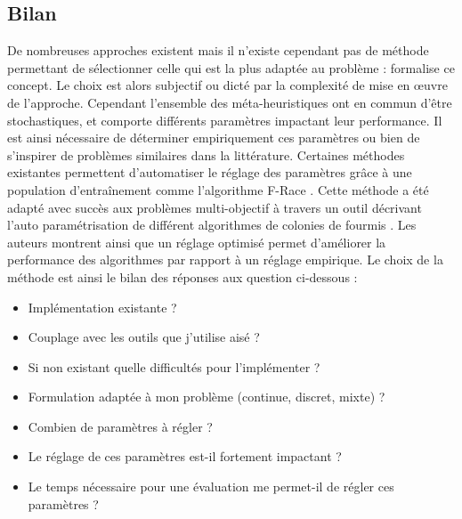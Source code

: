 \subsection{Bilan} %
\label{sub:bilan}
De nombreuses approches existent mais il n’existe cependant pas de méthode permettant de
sélectionner celle qui est la plus adaptée au problème : \cite{Wolpert199767} formalise
ce concept. Le choix est alors subjectif ou dicté par la complexité de mise en œuvre
de l’approche.
Cependant l’ensemble des méta-heuristiques ont en commun d’être stochastiques, et comporte
différents paramètres impactant leur performance.
Il est ainsi nécessaire de déterminer empiriquement ces paramètres ou bien de s’inspirer
de problèmes similaires dans la littérature.
Certaines méthodes existantes permettent d’automatiser le réglage des
paramètres grâce à une population d’entraînement comme l’algorithme F-Race \parencite{Birattari2010311}.
Cette méthode a été adapté avec succès aux problèmes multi-objectif à travers un outil
décrivant l’auto paramétrisation de différent algorithmes de colonies de fourmis \parencite{Lopez-Ibanez2012861}.
Les auteurs montrent ainsi que un réglage optimisé permet d’améliorer la performance
des algorithmes par rapport à un réglage empirique.
Le choix de la méthode est ainsi le bilan des réponses aux question ci-dessous :
\begin{itemize}
  \item Implémentation existante ?
  \item Couplage avec les outils que j’utilise aisé ?
  \item Si non existant quelle difficultés pour l’implémenter ?
  \item Formulation adaptée à mon problème (continue, discret, mixte) ?
  \item Combien de paramètres à régler ?
  \item Le réglage de ces paramètres est-il fortement impactant ?
  \item Le temps nécessaire pour une évaluation me permet-il de régler ces paramètres ?
\end{itemize}






